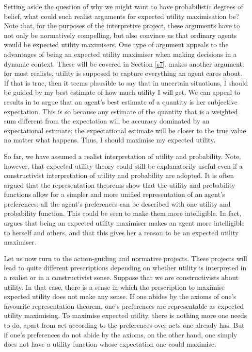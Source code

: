 Setting aside the question of why we might want to have probabilistic degrees of belief, what could such realist arguments for expected utility maximisation be? Note that, for the purposes of the interpretive project, these arguments have to not only be normatively compelling, but also convince us that ordinary agents would be expected utility maximisers. One type of argument appeals to the advantages of being an expected utility maximiser when making decisions in a dynamic context. These will be covered in Section \ref{s7}. \citet{Pettigrew2014} makes another argument: for most realists, utility is supposed to capture everything an agent cares about. If that is true, then it seems plausible to say that in uncertain situations, I should be guided by my best estimate of how much utility I will get. We can appeal to results in \citet{deFinetti1974} to argue that an agent's best estimate of a quantity is her subjective expectation. This is so because any estimate of the quantity that is a weighted sum different from the expectation will be accuracy dominated by an expectational estimate: the expectational estimate will be closer to the true value no matter what happens. Thus, I should maximise my expected utility.

So far, we have assumed a realist interpretation of utility and probability. Note, however, that expected utility theory could still be explanatorily useful even if a constructivist interpretation of utility and probability are adopted. It is often argued that the representation theorems show that the utility and probability functions allow for a simpler and more unified representation of an agent's preferences: all the agent's preferences can be described with one utility and probability function. This could be seen to make them more intelligible. In fact, \citet{Velleman1993} argues that being an expected utility maximiser makes an agent more intelligible to herself and others, and that this gives her a reason to be an expected utility maximiser.

Let us now turn to the action-guiding and normative projects. These projects will lead to quite different prescriptions depending on whether utility is interpreted in a realist or in a constructivist sense. Suppose that we are constructivists about utility. In that case, there is a sense in which the prescription to maximise expected utility does not make any sense. If one abides by the axioms of one's favourite representation theorem, one's preferences are representable as expected utility maximising. To maximise expected utility, there is nothing more one needs to do, apart from act according to the preferences over acts one already has.  But if one's preferences do not abide by the axioms, on the other hand, one simply does not have a utility function whose expectation one could maximise.

